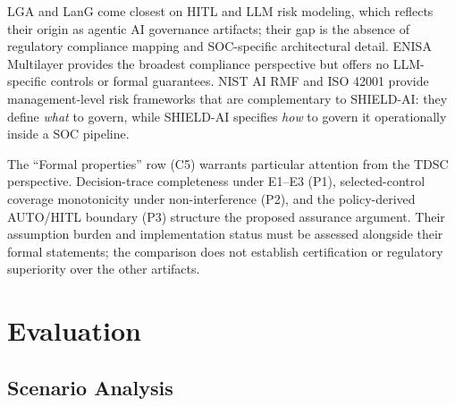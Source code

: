 \documentclass[journal]{IEEEtran}
\begin{document}
LGA and LanG come closest on HITL and LLM risk modeling, which reflects their origin as
agentic AI governance artifacts; their gap is the absence of regulatory compliance mapping
and SOC-specific architectural detail. ENISA Multilayer provides the broadest compliance
perspective but offers no LLM-specific controls or formal guarantees. NIST AI RMF and
ISO 42001 provide management-level risk frameworks that are complementary to SHIELD-AI:
they define \emph{what} to govern, while SHIELD-AI specifies \emph{how} to govern it
operationally inside a SOC pipeline.

The ``Formal properties'' row (C5) warrants particular attention from the TDSC perspective.
Decision-trace completeness under E1--E3 (P1), selected-control coverage monotonicity under
non-interference (P2), and the policy-derived AUTO/HITL boundary (P3) structure the proposed
assurance argument. Their assumption burden and implementation status must be assessed
alongside their formal statements; the comparison does not establish certification or
regulatory superiority over the other artifacts.

\section{Evaluation}
\label{sec:eval}

\subsection{Scenario Analysis}

\begin{table}[!t]
\renewcommand{\arraystretch}{1.2}
\caption{Author-scored scenario walkthrough (Likert 1--5). Scores illustrate internal design
coverage and are not an independent validation.}
\label{tab:scenarioscores}
\centering
\scriptsize
{}%
\end{table}
\end{document}
